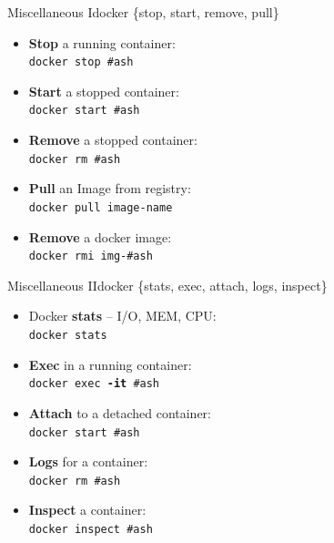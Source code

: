 \documentclass{beamer}
\begin{document}
\begin{frame}{Miscellaneous I}{docker \{stop, start, remove, pull\}}

{\Large
\begin{itemize}
    \item \textbf{Stop} a running container:\\
    \texttt{docker \alert{stop} \#ash}
    
    \item \textbf{Start} a stopped container:\\
    \texttt{docker \alert{start} \#ash}
    
    \item \textbf{Remove} a stopped container:\\
    \texttt{docker \alert{rm} \#ash} \\
    \hrulefill
    
    \item \textbf{Pull} an Image from registry:\\
    \texttt{docker \alert{pull} image-name}
    
    \item \textbf{Remove} a docker image:\\
    \texttt{docker \alert{rmi} img-\#ash}
\end{itemize}
}
    
\end{frame}

\begin{frame}{Miscellaneous II}{docker \{stats, exec, attach, logs, inspect\}}
    
{\Large
\begin{itemize}
    \item Docker \textbf{stats} -- I/O, MEM, CPU:\\
    \texttt{docker \alert{stats} }
    
    \hrulefill
    
    \item \textbf{Exec} in a running container:\\
    \texttt{docker \alert{exec} \textbf{-it} \#ash}
    
    \item \textbf{Attach} to a detached container:\\
    \texttt{docker \alert{start} \#ash}
    
    \item \textbf{Logs} for a container:\\
    \texttt{docker \alert{rm} \#ash} 
    \item \textbf{Inspect} a container:\\
    \texttt{docker \alert{inspect} \#ash}\\
\end{itemize}
}
\end{frame}
\end{document}
